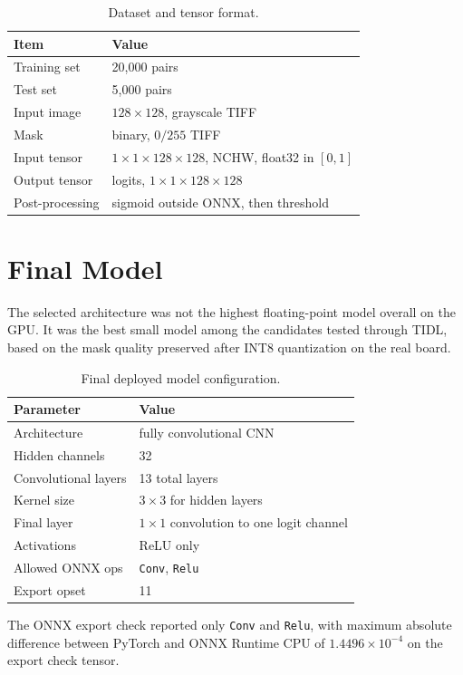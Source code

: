 \documentclass[11pt,a4paper]{article}
\begin{document}
\begin{table}[H]
\centering
\caption{Dataset and tensor format.}
\begin{tabular}{ll}
\toprule
Item & Value \\
\midrule
Training set & 20,000 pairs \\
Test set & 5,000 pairs \\
Input image & $128\times128$, grayscale TIFF \\
Mask & binary, $0/255$ TIFF \\
Input tensor & $1\times1\times128\times128$, NCHW, float32 in $[0,1]$ \\
Output tensor & logits, $1\times1\times128\times128$ \\
Post-processing & sigmoid outside ONNX, then threshold \\
\bottomrule
\end{tabular}
\end{table}

\section{Final Model}

The selected architecture was not the highest floating-point model overall on the GPU.  It was the best small model among the candidates tested through TIDL, based on the mask quality preserved after INT8 quantization on the real board.

\begin{table}[H]
\centering
\caption{Final deployed model configuration.}
\begin{tabular}{ll}
\toprule
Parameter & Value \\
\midrule
Architecture & fully convolutional CNN \\
Hidden channels & 32 \\
Convolutional layers & 13 total layers \\
Kernel size & $3\times3$ for hidden layers \\
Final layer & $1\times1$ convolution to one logit channel \\
Activations & ReLU only \\
Allowed ONNX ops & \texttt{Conv}, \texttt{Relu} \\
Export opset & 11 \\
\bottomrule
\end{tabular}
\end{table}

The ONNX export check reported only \texttt{Conv} and \texttt{Relu}, with maximum absolute difference between PyTorch and ONNX Runtime CPU of $1.4496\times10^{-4}$ on the export check tensor.
\end{document}
